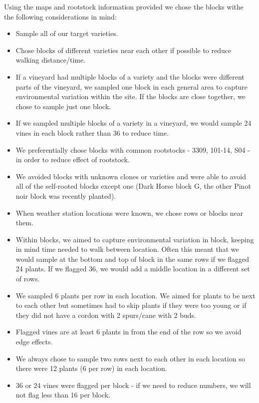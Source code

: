 \documentclass[11pt,letter]{article}
\newenvironment{smitemize}{
\begin{itemize}
  \setlength{\itemsep}{0pt}
  \setlength{\parskip}{0.8pt}
  \setlength{\parsep}{0pt}}
{\end{itemize}
}
\begin{document}
Using the maps and rootstock information provided we chose the blocks withe the following considerations in mind:
\begin{smitemize}
\item Sample all of our target varieties.
\item Chose blocks of different varieties near each other if possible to reduce walking distance/time. 
\item If a vineyard had multiple blocks of a variety and the blocks were different parts of the vineyard, we sampled one block in each general area to capture environmental variation within the site. If the blocks are close together, we chose to sample just one block.
\item If we sampled multiple blocks of a variety in a vineyard, we would sample 24 vines in each block rather than 36 to reduce time.
\item We preferentially chose blocks with common rootstocks - 3309, 101-14, S04 - in order to reduce effect of rootstock.
\item We avoided blocks with unknown clones or varieties and were able to avoid all of the self-rooted blocks except one (Dark Horse block G, the other Pinot noir block was recently planted).
\item When weather station locations were known, we chose rows or blocks near them.
\item Within blocks, we aimed to capture environmental variation in block, keeping in mind time needed to walk between location. Often this meant that we would sample at the bottom and top of block in the same rows if we flagged 24 plants. If we flagged 36, we would add a middle location in a different set of rows. 
\item We sampled 6 plants per row in each location. We aimed for plants to be next to each other but sometimes had to skip plants if they were too young or if they did not have a cordon with 2 spurs/cane with 2 buds.
\item Flagged vines are at least 6 plants in from the end of the row so we avoid edge effects.
\item We always chose to sample two rows next to each other in each location so there were 12 plants (6 per row) in each location.
\item 36 or 24 vines were flagged per block - if we need to reduce numbers, we will not flag less than 16 per block.

\end{smitemize}
\end{document}

